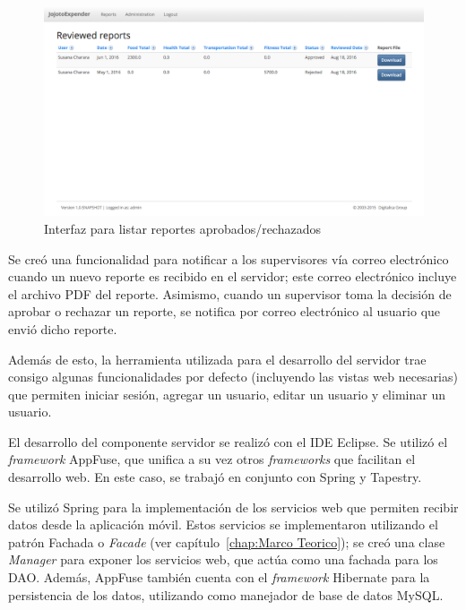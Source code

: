 \begin{figure}[ht]
  \centering
  \includegraphics[scale=0.38,type=png,ext=.png,read=.png]{imagenes/reviewed_reports}
  \captionsetup{justification=centering}
  \caption{Interfaz para listar reportes aprobados/rechazados}
  \label{fig:interfazListarReportesRevisados}
\end{figure}


Se creó una funcionalidad para notificar a los supervisores vía correo electrónico cuando un nuevo reporte es recibido en el servidor; este correo electrónico incluye el archivo PDF del reporte. Asimismo, cuando un supervisor toma la decisión de aprobar o rechazar un reporte, se notifica por correo electrónico al usuario que envió dicho reporte.

Además de esto, la herramienta utilizada para el desarrollo del servidor trae consigo algunas funcionalidades por defecto (incluyendo las vistas web necesarias) que permiten iniciar sesión, agregar un usuario, editar un usuario y eliminar un usuario. 

El desarrollo del componente servidor se realizó con el IDE Eclipse. Se utilizó el \textit{framework} AppFuse, que unifica a su vez otros \textit{frameworks} que facilitan el desarrollo web. En este caso, se trabajó en conjunto con Spring y Tapestry.

Se utilizó Spring para la implementación de los servicios web que permiten recibir datos desde la aplicación móvil. Estos servicios se implementaron utilizando el patrón Fachada o \textit{Facade} (ver capítulo~\ref{chap:Marco Teorico}); se creó una clase \textit{Manager} para exponer los servicios web, que actúa como una fachada para los DAO. Además, AppFuse también cuenta con el \textit{framework} Hibernate para la persistencia de los datos, utilizando como manejador de base de datos MySQL.

